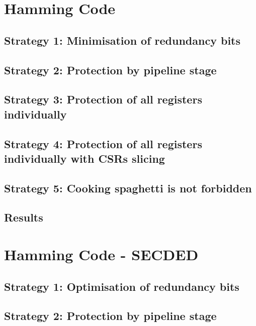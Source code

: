\section{Hamming Code}
\label{section:chap6_hammingcode}

\subsection{Strategy 1: Minimisation of redundancy bits}

\subsection{Strategy 2: Protection by pipeline stage}

\subsection{Strategy 3: Protection of all registers individually}

\subsection{Strategy 4: Protection of all registers individually with CSRs slicing}

\subsection{Strategy 5: Cooking spaghetti is not forbidden}

\subsection{Results}

\section{Hamming Code - SECDED}
\label{section:chap6_secded}

\subsection{Strategy 1: Optimisation of redundancy bits}

\subsection{Strategy 2: Protection by pipeline stage}

